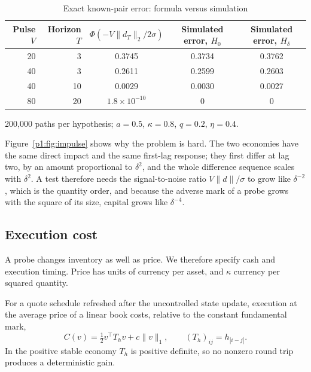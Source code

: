 \begin{table}[t]\centering
\begin{threeparttable}
\caption{Exact known-pair error: formula versus simulation}\label{p1:tab:mcerr}
\begin{tabular}{rrccc}
\toprule
Pulse $V$ & Horizon $T$ & $\Phi(-V\|d_T\|_2/2\sigma)$ & Simulated error, $H_0$ & Simulated error, $H_\delta$\\
\midrule
20 & 3 & 0.3745 & 0.3734 & 0.3762\\
40 & 3 & 0.2611 & 0.2599 & 0.2603\\
40 & 10 & 0.0029 & 0.0030 & 0.0027\\
80 & 20 & $1.8\times10^{-10}$ & 0 & 0\\
\bottomrule
\end{tabular}
\begin{tablenotes}\footnotesize\item 200,000 paths per hypothesis; $a=0.5$, $\kappa=0.8$, $q=0.2$, $\eta=0.4$. \end{tablenotes}
\end{threeparttable}
\end{table}

Figure~\ref{p1:fig:impulse} shows why the problem is hard. The two economies have the same direct impact and the same first-lag response; they first differ at lag two, by an amount proportional to $\delta^2$, and the whole difference sequence scales with $\delta^2$. A test therefore needs the signal-to-noise ratio $V\|d\|/\sigma$ to grow like $\delta^{-2}$, which is the quantity order, and because the adverse mark of a probe grows with the square of its size, capital grows like $\delta^{-4}$.

\subsection{Execution cost}

A probe changes inventory as well as price. We therefore specify cash and execution timing. Price has units of currency per asset, and $\kappa$ currency per squared quantity.

\begin{lemma}\label{p1:lem:toeplitz}
For a quote schedule refreshed after the uncontrolled state update, execution at the average price of a linear book costs, relative to the constant fundamental mark,
\begin{equation}\label{p1:eq:cost}
C(v)=\tfrac12v^\top T_hv+c\|v\|_1,\qquad (T_h)_{ij}=h_{|i-j|}.
\end{equation}
In the positive stable economy $T_h$ is positive definite, so no nonzero round trip produces a deterministic gain.
\end{lemma}

